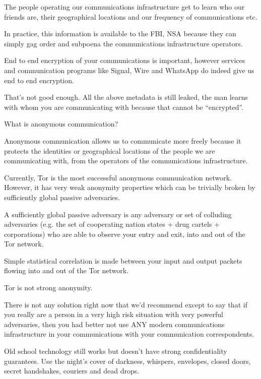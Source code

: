 \documentclass[statementpaper,oneside,article,14pt]{memoir}
\begin{document}
\newpage

The people operating our communications infrastructure
get to learn who our friends are, their geographical locations and
our frequency of communications etc.

In practice, this information is available to the FBI, NSA because they
can simply gag order and subpoena the communications infrastructure operators.

End to end encryption of your communications is important, however
services and communication programs like Signal, Wire and WhatsApp do
indeed give us end to end encryption.

That's not good enough. All the above metadata is still leaked, the man learns
with whom you are communicating with because that cannot be ``encrypted''.

\newpage

What is anonymous communication?

Anonymous communication allows us to communicate more freely because
it protects the identities or geographical locations of the people we
are communicating with, from the operators of the communications
infrastructure.

Currently, Tor is the most successful anonymous communication network.
However, it has very weak anonymity properties which can be trivially
broken by sufficiently global passive adversaries.

A sufficiently global passive adversary is any adversary or set of colluding
adversaries (e.g. the set of cooperating nation states + drug cartels + corporations)
who are able to observe your entry and exit, into and out of the Tor network.

Simple statistical correlation is made between your input and output packets flowing
into and out of the Tor network.

Tor is not strong anonymity.

\newpage

There is not any solution right now that we'd recommend except to say
that if you really are a person in a very high risk situation with
very powerful adversaries, then you had better not use ANY modern
communications infrastructure in your communications with your
communication correspondents.

Old school technology still works but doesn't have strong
confidentiality guarantees. Use the night's cover of darkness,
whispers, envelopes, closed doors, secret handshakes,
couriers and dead drops.
\end{document}
